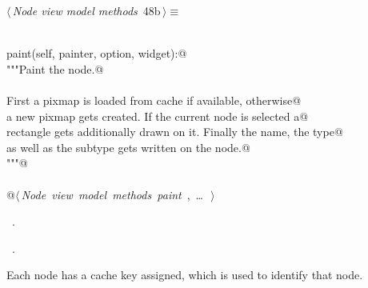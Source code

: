 \documentclass[
    a4paper,      %
    10pt,         %
    openright,    %
    notitlepage,  %
    parskip=half, %
]{scrreprt}       %
\theoremstyle{definition}                    %
\begin{document}
\begin{flushleft} \small
\begin{minipage}{\linewidth}\label{scrap64}\raggedright\small
{} $\langle\,${\itshape Node view model methods}\nobreak\ {\footnotesize {48b}}$\,\rangle\equiv$
\vspace{-1exm}
\begin{list}{}{} \item
\mbox{}\lstinline@@\\
\mbox{}\lstinline@def paint(self, painter, option, widget):@\\
\mbox{}\lstinline@    """Paint the node.@\\
\mbox{}\lstinline@@\\
\mbox{}\lstinline@    First a pixmap is loaded from cache if available, otherwise@\\
\mbox{}\lstinline@    a new pixmap gets created. If the current node is selected a@\\
\mbox{}\lstinline@    rectangle gets additionally drawn on it. Finally the name, the type@\\
\mbox{}\lstinline@    as well as the subtype gets written on the node.@\\
\mbox{}\lstinline@    """@\\
\mbox{}\lstinline@@\\
\mbox{}\lstinline@    @\hbox{$\langle\,${\itshape Node view model methods paint}\nobreak\ {\footnotesize {}, \ldots\ }$\,\rangle$}\lstinline@@\\
\mbox{}\lstinline@@{\NWsep}
\end{list}
\vspace{-1.5ex}
\footnotesize
\begin{list}{}{\setlength{\itemsep}{-\parsep}\setlength{\itemindent}{-\leftmargin}}
\item \NWtxtMacroDefBy\ .
\item \NWtxtMacroRefIn\ .

\item{}
\end{list}
\end{minipage}\vspace{4ex}
\end{flushleft}
Each node has a cache key assigned, which is used to identify that node.
\end{document}
